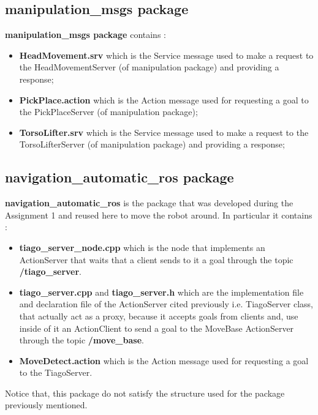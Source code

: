 \subsection{manipulation\_msgs package}
\textbf{manipulation\_msgs package} contains :
\begin{itemize}
    \item \textbf{HeadMovement.srv} which is the Service message used to make a request to the HeadMovementServer (of manipulation package) and providing a response;
     \item \textbf{PickPlace.action} which is the Action message used for requesting a goal to the PickPlaceServer (of manipulation package);
     \item \textbf{TorsoLifter.srv} which is the Service message used to make a request to the TorsoLifterServer (of manipulation package) and providing a response;
\end{itemize}
\subsection{navigation\_automatic\_ros package}
\textbf{navigation\_automatic\_ros} is the package that was developed during the Assignment 1 and reused here to move the robot around.
\newline
In particular it contains :
\begin{itemize}
    \item \textbf{tiago\_server\_node.cpp} which is the node that implements an ActionServer that waits that a client sends to it a goal through the topic \textbf{/tiago\_server}.
    \item \textbf{tiago\_server.cpp} and \textbf{tiago\_server.h} which are the implementation file and declaration file of the ActionServer cited previously i.e. TiagoServer class, that actually act as a proxy, because it accepts goals from clients and, use inside of it an ActionClient to send a goal to the MoveBase ActionServer through the topic \textbf{/move\_base}.
    \item \textbf{MoveDetect.action} which is the Action message used for requesting a goal to the TiagoServer.
\end{itemize}
Notice that, this package do not satisfy the structure used for the package previously mentioned.
